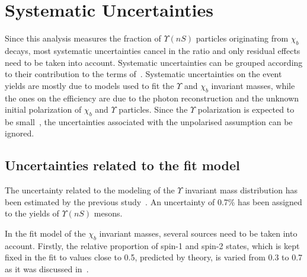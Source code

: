 \section[Systematic]{Systematic Uncertainties}
\label{sec:syst}

Since this analysis measures the fraction of $\Upsilon(nS)$ particles
originating from $\chi_b$ decays, most systematic uncertainties cancel in the
ratio and only residual effects need to be taken into account. Systematic
uncertainties can be grouped according to their contribution to the terms
of~. Systematic uncertainties on the event yields are mostly
due to models used to fit the $\Upsilon$ and $\chi_b$ invariant masses, while
the ones on the efficiency are due to the photon reconstruction and the unknown
initial polarization of $\chi_b$ and $\Upsilon$ particles. Since the $\Upsilon$
polarization is expected to be small~\cite{Aaij:2013yaa,Aaij:2014nwa}, the
uncertainties associated with the unpolarised assumption can be ignored. 
 

\subsection{Uncertainties related to the fit model}

 
% 



The uncertainty related to the modeling of the $\Upsilon$ invariant mass
distribution has been estimated by the previous
study~\cite{Aaij:2013yaa}. An uncertainty of 0.7\% has been assigned to the
yields of $\Upsilon(nS)$ mesons.

In the fit model of the $\chi_b$ invariant masses, several sources need to be
taken into account. Firstly, the relative proportion of spin-1 and spin-2
states, which is kept fixed in the fit to values close to 0.5, predicted by
theory, is varied from 0.3 to 0.7 as it was discussed in~.


